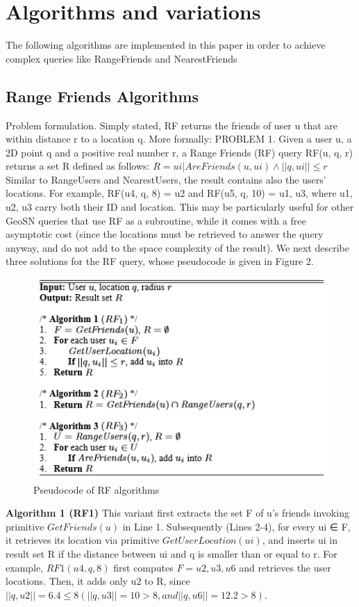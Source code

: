 \documentclass[prodmode,acmtods]{acmsmall} %
\begin{document}
\section{Algorithms and variations}
The following algorithms are implemented in this paper in order to achieve complex queries like RangeFriends and NearestFriends

\subsection{Range Friends Algorithms}
Problem formulation. Simply stated, RF returns the friends of
user u that are within distance r to a location q. More formally:
PROBLEM 1. Given a user u, a 2D point q and a positive real
number r, a Range Friends (RF) query RF(u, q, r) returns a set
R defined as follows:
\newline
\newline
$  R = {ui | AreFriends(u, ui) ∧ ||q, ui|| ≤ r} $
\newline
\newline
Similar to RangeUsers and NearestUsers, the result contains
also the users’ locations. For example, RF(u4, q, 8) = {u2} and
RF(u5, q, 10) = {u1, u3}, where u1, u2, u3 carry both their ID
and location. This may be particularly useful for other GeoSN
queries that use RF as a subroutine, while it comes with a free
asymptotic cost (since the locations must be retrieved to answer the
query anyway, and do not add to the space complexity of the result).
We next describe three solutions for the RF query, whose pseudocode
is given in Figure 2.

\begin{figure}[h]
\centering
\includegraphics[width=0.7\linewidth]{./graphics/RF_algorithm}
\caption{Pseudocode of RF algorithms}
\label{fig:RF_algorithm}
\end{figure}


\textbf{Algorithm 1 (RF1)}
\newline
This variant first extracts the set F of u’s
friends invoking primitive $GetFriends(u)$ in Line 1. Subsequently
(Lines 2-4), for every ui ∈ F, it retrieves its location via primitive
$GetUserLocation(ui)$, and inserts ui in result set R if the distance
between ui and q is smaller than or equal to r. For example,
$RF1(u4, q, 8)$ first computes $F = {u2, u3, u6}$ and retrieves the
user locations. Then, it adds only u2 to R, since $||q, u2|| = 6.4 ≤ 8
(||q, u3|| = 10 > 8, and ||q, u6|| = 12.2 > 8)$.
\end{document}
